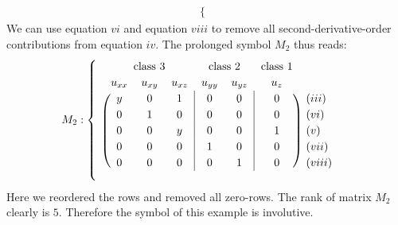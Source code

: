 \begin{example}
\begin{align}
\begin{cases}
            \end{cases}
\end{align}
We can use equation $vi$ and equation $viii$ to remove all second-derivative-order contributions from equation $iv$.
The prolonged symbol $M_2$ thus reads:
\begin{align}
M_2 : \begin{cases}
\ \ 
\begin{blockarray}{ccccccc}
\BAmulticolumn{3}{c}{\text{class 3}} & 
\BAmulticolumn{2}{c}{\text{class 2}} & 
\text{class 1} \\
u_{xx} & u_{xy} & u_{xz} & u_{yy} & u_{yz} & u_{z} \\
\begin{block}{(ccc|cc|c)l}
  y & 0 & 1 & 0 & 0 & 0 & (iii) \\
  0 & 1 & 0 & 0 & 0 & 0 & (vi) \\
  0 & 0 & y & 0 & 0 & 1 & (v) \\
  0 & 0 & 0 & 1 & 0 & 0 & (vii) \\
  0 & 0 & 0 & 0 & 1 & 0 & (viii) \\
\end{block}
\end{blockarray}
\end{cases}
\end{align}
Here we reordered the rows and removed all zero-rows. The rank of matrix $M_2$ clearly is $5$. Therefore the symbol of this example is involutive.
\end{example}

